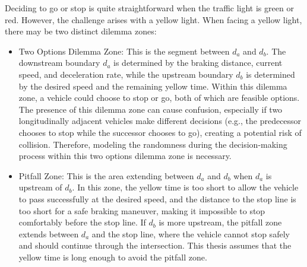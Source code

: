 Deciding to go or stop is quite straightforward when the traffic light is green or red. However, the challenge arises with a yellow light. When facing a yellow light, there may be two distinct dilemma zones:
\begin{itemize}
    \item Two Options Dilemma Zone: This is the segment between \( d_a \) and \( d_b \). The downstream boundary \( d_a \) is determined by the braking distance, current speed, and deceleration rate, while the upstream boundary \( d_b \) is determined by the desired speed and the remaining yellow time. Within this dilemma zone, a vehicle could choose to stop or go, both of which are feasible options. The presence of this dilemma zone can cause confusion, especially if two longitudinally adjacent vehicles make different decisions (e.g., the predecessor chooses to stop while the successor chooses to go), creating a potential risk of collision. Therefore, modeling the randomness during the decision-making process within this two options dilemma zone is necessary.
    \item Pitfall Zone: This is the area extending between \(d_a\) and \(d_b\) when \(d_a\) is upstream of \(d_b\). In this zone, the yellow time is too short to allow the vehicle to pass successfully at the desired speed, and the distance to the stop line is too short for a safe braking maneuver, making it impossible to stop comfortably before the stop line. If \(d_b\) is more upstream, the pitfall zone extends between \(d_a\) and the stop line, where the vehicle cannot stop safely and should continue through the intersection. This thesis assumes that the yellow time is long enough to avoid the pitfall zone.
\end{itemize}


